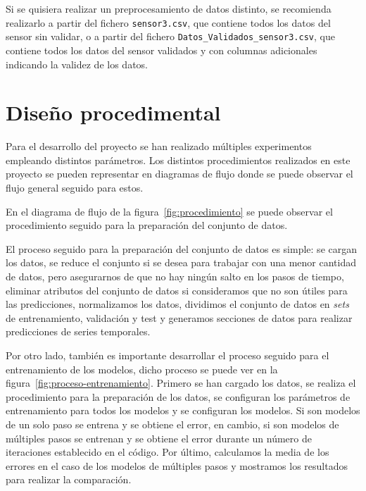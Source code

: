 Si se quisiera realizar un preprocesamiento de datos distinto, se recomienda realizarlo a partir del fichero \texttt{sensor3.csv}, que contiene todos los datos del sensor sin validar, o a partir del fichero \texttt{Datos\_Validados\_sensor3.csv}, que contiene todos los datos del sensor validados y con columnas adicionales indicando la validez de los datos.

\section{Diseño procedimental}

Para el desarrollo del proyecto se han realizado múltiples experimentos empleando distintos parámetros. Los distintos procedimientos realizados en este proyecto se pueden representar en diagramas de flujo donde se puede observar el flujo general seguido para estos.

En el diagrama de flujo de la figura~\ref{fig:procedimiento} se puede observar el procedimiento seguido para la preparación del conjunto de datos.


El proceso seguido para la preparación del conjunto de datos es simple: se cargan los datos, se reduce el conjunto si se desea para trabajar con una menor cantidad de datos, pero asegurarnos de que no hay ningún salto en los pasos de tiempo, eliminar atributos del conjunto de datos si consideramos que no son útiles para las predicciones, normalizamos los datos, dividimos el conjunto de datos en \textit{sets} de entrenamiento, validación y test y generamos secciones de datos para realizar predicciones de series temporales.

Por otro lado, también es importante desarrollar el proceso seguido para el entrenamiento de los modelos, dicho proceso se puede ver en la figura~\ref{fig:proceso-entrenamiento}. Primero se han cargado los datos, se realiza el procedimiento para la preparación de los datos, se configuran los parámetros de entrenamiento para todos los modelos y se configuran los modelos. Si son modelos de un solo paso se entrena y se obtiene el error, en cambio, si son modelos de múltiples pasos se entrenan y se obtiene el error durante un número de iteraciones establecido en el código. Por último, calculamos la media de los errores en el caso de los modelos de múltiples pasos y mostramos los resultados para realizar la comparación.


